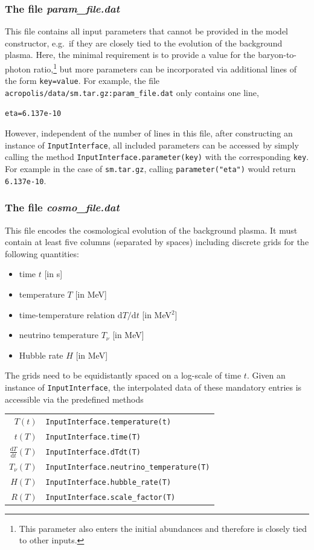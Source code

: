\documentclass[11pt,a4paper]{article}
\begin{document}
\subsubsection{The file \textit{param\_file.dat}}
This file contains all input parameters that cannot be provided in the model constructor, e.g.\ if they are closely tied to the evolution of the background plasma. Here, the minimal requirement is to provide a value for the baryon-to-photon ratio,\footnote{This parameter also enters the initial abundances and therefore is closely tied to other inputs.} but more parameters can be incorporated via additional lines of the form \texttt{key=value}. For example, the file \texttt{acropolis/data/sm.tar.gz:param\_file.dat} only contains one line,
\begin{lstlisting}[backgroundcolor=\color{white}]
eta=6.137e-10
\end{lstlisting}
However, independent of the number of lines in this file, after constructing an instance of \texttt{InputInterface}, all included parameters can be accessed by simply calling the method \texttt{InputInterface.parameter(key)} with the corresponding \texttt{key}. For example in the case of \texttt{sm.tar.gz}, calling \texttt{parameter("eta")} would return \texttt{6.137e-10}.

\subsubsection{The file \textit{cosmo\_file.dat}}
This file encodes the cosmological evolution of the background plasma. It must contain at least five columns (separated by spaces) including discrete grids for the following quantities:
\begin{itemize}
\item time $t$ [in s]
\item temperature $T$ [in MeV]
\item time-temperature relation $\text{d}T/\text{d}t$ [in MeV$^2$]
\item neutrino temperature $T_\nu$ [in MeV]
\item Hubble rate $H$ [in MeV]
\end{itemize}
The grids need to be equidistantly spaced on a log-scale of time $t$. Given an instance of \texttt{InputInterface}, the interpolated data of these mandatory entries is accessible via the predefined methods
\begin{center}
\begin{tabular}{rl}
	$T(t)$ & \texttt{InputInterface.temperature(t)} \\[0.2cm]
	$t(T)$ & \texttt{InputInterface.time(T)} \\[0.2cm]
	$\frac{\text{d}T}{\text{d}t}(T)$ & \texttt{InputInterface.dTdt(T)} \\[0.2cm]
	$T_\nu(T)$ & \texttt{InputInterface.neutrino\_temperature(T)} \\[0.2cm]
	$H(T)$ & \texttt{InputInterface.hubble\_rate(T)} \\[0.2cm]
	$R(T)$ & \texttt{InputInterface.scale\_factor(T)} \\[0.2cm]
\end{tabular}
\end{center}
\end{document}
